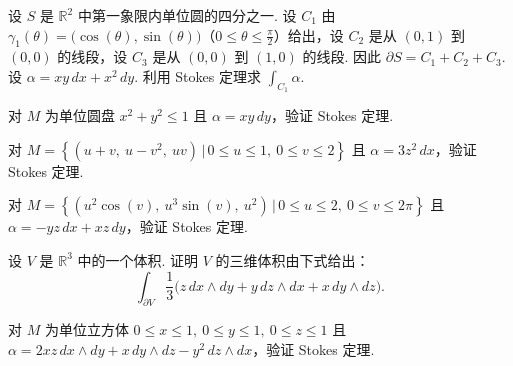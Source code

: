 \begin{question}\label{q:11-27}
设 $S$ 是 $\mathbb{R}^2$ 中第一象限内单位圆的四分之一. 设 $C_1$ 由 $\gamma_1(\theta)=\bigl(\cos(\theta),\sin(\theta)\bigr)$（$0\leq\theta\leq\frac{\pi}{2}$）给出，设 $C_2$ 是从 $(0,1)$ 到 $(0,0)$ 的线段，设 $C_3$ 是从 $(0,0)$ 到 $(1,0)$ 的线段. 因此 $\partial S=C_1+C_2+C_3$. 设 $\alpha=xy\,dx+x^2\,dy$. 利用 Stokes 定理求 $\int_{C_1}\alpha$.
\end{question}

\begin{question}\label{q:11-28}
对 $M$ 为单位圆盘 $x^2+y^2\leq 1$ 且 $\alpha=xy\,dy$，验证 Stokes 定理.
\end{question}

\begin{question}\label{q:11-29}
对 $M=\left\{(u+v,\ u-v^2,\ uv)\,\bigl|\,0\leq u\leq 1,\ 0\leq v\leq 2\right\}$ 且 $\alpha=3z^2\,dx$，验证 Stokes 定理.
\end{question}

\begin{question}\label{q:11-30}
对 $M=\left\{(u^2\cos(v),\ u^3\sin(v),\ u^2)\,\bigl|\,0\leq u\leq 2,\ 0\leq v\leq 2\pi\right\}$ 且 $\alpha=-yz\,dx+xz\,dy$，验证 Stokes 定理.
\end{question}

\begin{question}\label{q:11-31}
设 $V$ 是 $\mathbb{R}^3$ 中的一个体积. 证明 $V$ 的三维体积由下式给出：
\[
\int_{\partial V}\frac{1}{3}\bigl(z\,dx\wedge dy+y\,dz\wedge dx+x\,dy\wedge dz\bigr).
\]
\end{question}

\begin{question}\label{q:11-32}
对 $M$ 为单位立方体 $0\leq x\leq 1,\ 0\leq y\leq 1,\ 0\leq z\leq 1$ 且 $\alpha=2xz\,dx\wedge dy+x\,dy\wedge dz-y^2\,dz\wedge dx$，验证 Stokes 定理.
\end{question}
